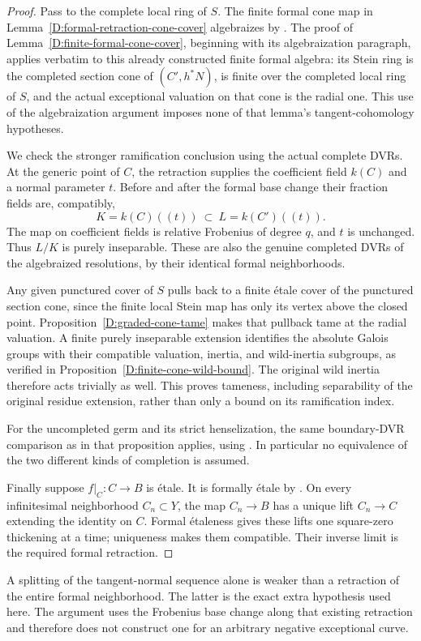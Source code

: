 \begin{proof}
Pass to the complete local ring of $S$.  The finite formal
cone map in Lemma~\ref{D:formal-retraction-cone-cover}
algebraizes by \cite[Lemma 30.28.2, tag 09ZT]
{StacksBFiniteCone}.  The proof of
Lemma~\ref{D:finite-formal-cone-cover}, beginning with its
algebraization paragraph, applies verbatim to this already
constructed finite formal algebra: its Stein ring is the
completed section cone of $(C',h^*N)$, is finite over the
completed local ring of $S$, and the actual exceptional
valuation on that cone is the radial one.  This use of the
algebraization argument imposes none of that lemma's
tangent-cohomology hypotheses.

We check the stronger ramification conclusion using the
actual complete DVRs.  At the generic point of $C$, the
retraction supplies the coefficient field $k(C)$ and a
normal parameter $t$.  Before and after the formal base
change their fraction fields are, compatibly,
\[
                 K=k(C)((t))\ \subset\ L=k(C')((t)).
\]
The map on coefficient fields is relative Frobenius of
degree $q$, and $t$ is unchanged.  Thus $L/K$ is purely
inseparable.  These are also the genuine completed DVRs
of the algebraized resolutions, by their identical formal
neighborhoods.

Any given punctured cover of $S$ pulls back to a finite
\'etale cover of the punctured section cone, since the
finite local Stein map has only its vertex above the
closed point.  Proposition~\ref{D:graded-cone-tame} makes
that pullback tame at the radial valuation.  A finite
purely inseparable extension identifies the absolute
Galois groups with their compatible valuation, inertia,
and wild-inertia subgroups, as verified in
Proposition~\ref{D:finite-cone-wild-bound}.  The original
wild inertia therefore acts trivially as well.  This
proves tameness, including separability of the original
residue extension, rather than only a bound on its
ramification index.

For the uncompleted germ and its strict henselization,
the same boundary-DVR comparison as in that proposition
applies, using \cite[Lemma 54.11.1, tag 0BG4]
{StacksBFiniteCone}.  In particular no equivalence of
the two different kinds of completion is assumed.

Finally suppose $f|_C:C\to B$ is \'etale.  It is formally
\'etale by \cite[Lemma 37.8.7, tag 04FF]
{StacksFormalRetractionRoot}.  On every infinitesimal
neighborhood $C_n\subset Y$, the map $C_n\to B$ has a
unique lift $C_n\to C$ extending the identity on $C$.
Formal \'etaleness gives these lifts one square-zero
thickening at a time; uniqueness makes them compatible.
Their inverse limit is the required formal retraction.
\end{proof}

\begin{remark}
A splitting of the tangent-normal sequence alone is
weaker than a retraction of the entire formal
neighborhood.  The latter is the exact extra hypothesis
used here.  The argument uses the Frobenius base change
along that existing retraction and therefore does not
construct one for an arbitrary negative exceptional curve.
\end{remark}
